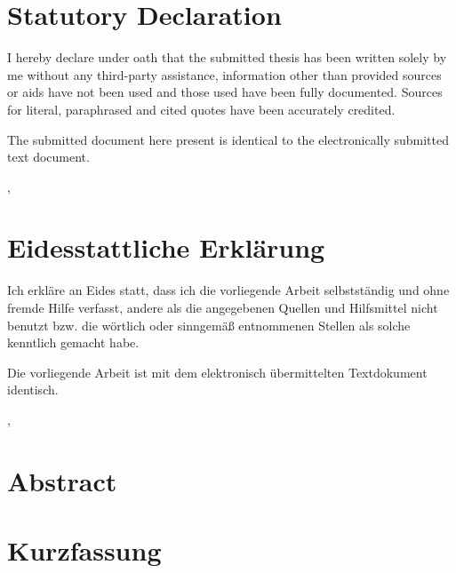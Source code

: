 
	\ifeng \chapter*{Statutory Declaration}
	I hereby declare under oath that the submitted thesis has been written solely by me without any third-party assistance, information other than provided sources or aids have not been used and those used have been fully documented. Sources for literal, paraphrased and cited quotes have been accurately credited.
	
	The submitted document here present is identical to the electronically submitted text document.
	
	\vskip1cm
	\place, \date
	
	\else \chapter*{Eidesstattliche Erklärung}
	Ich erkläre an Eides statt, dass ich die vorliegende Arbeit selbstständig und ohne fremde Hilfe verfasst, andere als die angegebenen Quellen und Hilfsmittel nicht benutzt bzw. die wörtlich oder sinngemäß entnommenen Stellen als solche kenntlich gemacht habe.

	Die vorliegende Arbeit ist mit dem elektronisch übermittelten Textdokument identisch.
	
	\vskip1cm
	\place, \date
	\fi


	\ifeng	\chapter*{Abstract}
	\else	\chapter*{Kurzfassung}
	\fi
		


